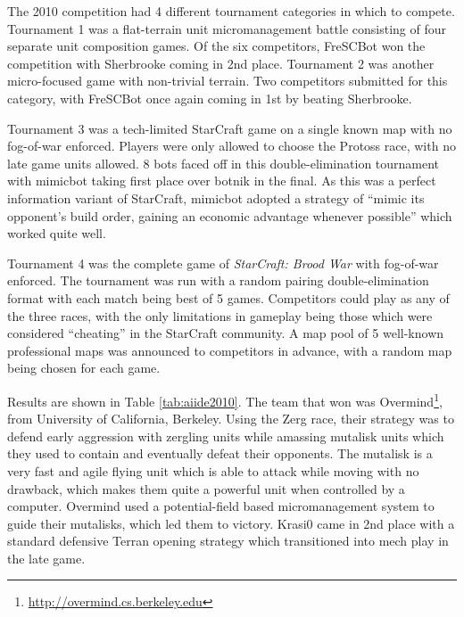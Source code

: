 \documentclass[journal]{IEEEtran}
\begin{document}
The 2010 competition had 4 different tournament categories in which to compete. Tournament 1
was a flat-terrain unit micromanagement battle consisting of four separate unit
composition games. Of the six competitors, FreSCBot won the competition with
Sherbrooke coming in 2nd place. Tournament 2 was another micro-focused game with
non-trivial terrain. Two competitors submitted for this category, with FreSCBot
once again coming in 1st by beating Sherbrooke.

Tournament 3 was a tech-limited StarCraft game on a single known map with no fog-of-war enforced. Players
were only allowed to choose the Protoss race, with no late game units allowed. 8 bots
faced off in this double-elimination tournament with mimicbot taking first place over botnik in the final.
As this was a perfect information variant of StarCraft, mimicbot adopted a strategy of
``mimic its opponent's build order, gaining an economic advantage whenever possible'' which
worked quite well.

Tournament 4 was the complete game of {\em StarCraft: Brood War} with fog-of-war enforced. The tournament
was run with a random pairing double-elimination format with each match being best of 5 games.
Competitors could play as any of the three races, with the only limitations in gameplay
being those which were considered ``cheating'' in the StarCraft community. A map pool of
5 well-known professional maps was announced to competitors in advance, with a random map being chosen for each game.

Results are shown in Table \ref{tab:aiide2010}. The team that won was Overmind\footnote{\url{http://overmind.cs.berkeley.edu}}, from University of California, Berkeley. Using the Zerg race, their
strategy was to defend early aggression with zergling units while amassing mutalisk units
which they used to contain and eventually defeat their opponents. The mutalisk is a very fast and agile
flying unit which is able to attack while moving with no drawback, which makes them quite a powerful
unit when controlled by a computer. Overmind used a potential-field
based micromanagement system to guide their mutalisks, which led them to victory. Krasi0 came in 2nd place
with a standard defensive Terran opening strategy which transitioned into mech play in the late game.
\end{document}

